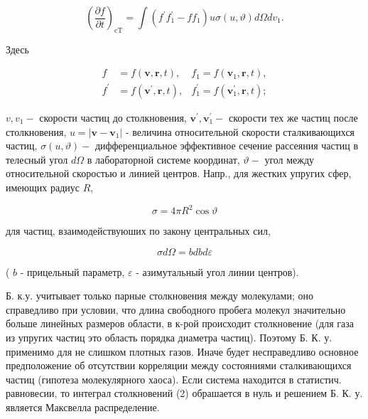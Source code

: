 \documentclass[10pt]{article}
\begin{document}
\[

\left(\frac{\partial f}{\partial t}\right)_{\mathrm{cT}}=\int\left(f^{\prime} f_{1}^{\prime}-f f_{1}\right) u \sigma(u, \vartheta) d \Omega d v_{1} .

\]



Здесь



\[

\begin{aligned}

f & =f(\boldsymbol{v}, \boldsymbol{r}, t), & f_{1}=f\left(\boldsymbol{v}_{1}, \boldsymbol{r}, t\right), \\

f^{\prime} & =f\left(\boldsymbol{v}^{\prime}, \boldsymbol{r}, t\right), & f_{1}^{\prime}=f\left(\boldsymbol{v}_{1}^{\prime}, \boldsymbol{r}, t\right) ;

\end{aligned}

\]



$v, v_{1}-$ скорости частиц до столкновения, $\boldsymbol{v}^{\prime}, \boldsymbol{v}_{1}^{\prime}-$ скорости тех же частиц после столкновения, $u=\left|\boldsymbol{v}-\boldsymbol{v}_{1}\right|$ - величина относительной скорости сталкивающихся частиц, $\sigma(u, \vartheta)-$ дифференциальное эффективное сечение рассеяния частиц в телесный угол $d \Omega$ в лабораторной системе координат, $\vartheta-$ угол между относительной скоростью и линией центров. Напр., для жестких упругих сфер, имеющих радиус $R$,



\[

\sigma=4 \pi R^{2} \cos \vartheta

\]



для частиц, взаимодействуюших по закону центральных сил,



\[

\sigma d \Omega=b d b d \varepsilon

\]



( $b$ - прицельный параметр, $\varepsilon$ - азимутальный угол линии центров).



Б. к.у. учитывает только парные столкновения между молекулами; оно справедливо при условии, что длина свободного пробега молекул значительно больше линейных размеров области, в к-рой происходит столкновение (для газа из упругих частиц это область порядка диаметра частиц). Поэтому Б. К. у. применимо для не слишком плотных газов. Иначе будет несправедливо основное предположение об отсутствии корреляции между состояниями сталкивающихся частиц (гипотеза молекулярного хаоса). Если система находится в статистич. равновесии, то интеграл столкновений (2) обрашается в нуль и решением Б. К. у. является Максвелла распределение.
\end{document}
